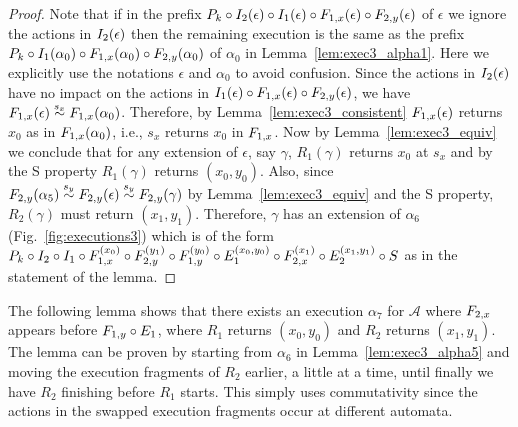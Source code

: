 \begin{proof}
Note  that if  in the prefix
 $\finiteprefixA{k-1}{k}  \circ \frage{I_2}{\epsilon}{} \circ \frage{I_1}{\epsilon}{} \circ \frage{F_{1,x}}{\epsilon}{} \circ  \frage{F_{2,y}}{\epsilon}{}$  of $\epsilon$ 
we ignore the actions in $\frage{I_2}{\epsilon}{}$
 then the remaining execution is the same as the prefix  
 $\finiteprefixA{k-1}{k}  \circ  \frage{I_1}{\alpha_0}{} \circ \frage{F_{1,x}}{\alpha_0}{} \circ  \frage{F_{2,y}}{\alpha_0}{}$ of $\alpha_0$ in 
Lemma~\ref{lem:exec3_alpha1}. Here we explicitly use the notations $\epsilon$ and $\alpha_0$ to avoid confusion. Since the actions in 
$\frage{I_2}{\epsilon}{}$ have no impact on the actions in 
 $\frage{I_1}{\epsilon}{} \circ \frage{F_{1,x}}{\epsilon}{} \circ  \frage{F_{2,y}}{\epsilon}{}$,
we have $\frage{F_{1,x}}{\epsilon}{} \stackrel{s_x}{\sim} \frage{F_{1,x}}{\alpha_0}{}$. Therefore, by Lemma~\ref{lem:exec3_consistent} 
  $\frage{F_{1,x}}{\epsilon}{}$ returns $x_0$ as in  $\frage{F_{1,x}}{\alpha_0}{}$, i.e., $s_x$ returns $x_0$ in $\fragn{F_{1,x}}{\epsilon}{x_0}$. 
Now by Lemma~\ref{lem:exec3_equiv} we  conclude that 
for  any  extension of $\epsilon$, say $\gamma$, \rot{} 
 $R_1(\gamma)$ returns $x_0$ at $s_x$ and by the S property  $R_1(\gamma)$ returns  $(x_0, y_0)$. Also, since 
$\frage{F_{2,y}}{\alpha_5}{} \stackrel{s_y}{\sim} \frage{F_{2,y}}{\epsilon}{} \stackrel{s_y}{\sim} \frage{F_{2,y}}{\gamma}{}$  by Lemma~\ref{lem:exec3_equiv} and the S property,  $R_2(\gamma)$ must return $(x_1, y_1)$.  Therefore, $\gamma$ has an extension of $\alpha_6$ (Fig.~\ref{fig:executions3}) which is of  the form $ \finiteprefixA{k-1}{k}  \circ\fragt{I_2}{\alpha_6}{} \circ  \fragt{I_1}{\alpha_6}{} \circ\fragt{F_{1,x}}{\alpha_6}{x_0}
\circ\fragt{F_{2,y}}{\alpha_6}{y_1}\circ \fragt{F_{1,y}}{\alpha_6}{y_0} \circ\fragt{E_1}{\alpha_6}{x_0, y_0}
\circ\fragt{F_{2,x}}{\alpha_6}{x_1} \circ \fragt{E_2}{\alpha_6}{x_1, y_1}\circ \fragt{S}{\alpha_6}{}$ as in the statement of the lemma.
\end{proof}


The  following lemma shows that there exists  an execution $\alpha_7$ for $\mathcal{A}$ where $\fragt{F_{2,x}}{\alpha_7}{}$ 
appears  before $\fragn{F_{1,y}}{\alpha_7}{y_0} \circ\fragn{E_1}{\alpha_7}{x_0, y_0}$, where $R_1$ returns $(x_0, y_0)$ and $R_2$ returns $(x_1, y_1)$.  The lemma can be proven by  starting from $\alpha_6$ in Lemma~\ref{lem:exec3_alpha5} and  moving the execution fragments  of $R_2$ earlier, a little at a time, until finally we have $R_2$ finishing before $R_1$ starts.  This simply uses commutativity since the actions in the swapped execution fragments occur at different automata.

